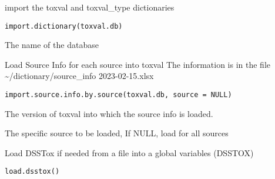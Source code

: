 \documentclass[letterpaper]{book}
\begin{document}
%
\begin{Description}\relax
import the toxval and toxval\_type dictionaries
\end{Description}
%
\begin{Usage}
\begin{verbatim}
import.dictionary(toxval.db)
\end{verbatim}
\end{Usage}
%
\begin{Arguments}
\begin{ldescription}
\item[\code{toxval.db}] The name of the database
\end{ldescription}
\end{Arguments}
%
\begin{Description}\relax
Load Source Info for each source into toxval
The information is in the file \textasciitilde{}/dictionary/source\_info 2023-02-15.xlsx
\end{Description}
%
\begin{Usage}
\begin{verbatim}
import.source.info.by.source(toxval.db, source = NULL)
\end{verbatim}
\end{Usage}
%
\begin{Arguments}
\begin{ldescription}
\item[\code{toxval.db}] The version of toxval into which the source info is loaded.

\item[\code{source}] The specific source to be loaded, If NULL, load for all sources
\end{ldescription}
\end{Arguments}
%
\begin{Description}\relax
Load DSSTox if needed from a file into a global variables (DSSTOX)
\end{Description}
%
\begin{Usage}
\begin{verbatim}
load.dsstox()
\end{verbatim}
\end{Usage}
\end{document}
